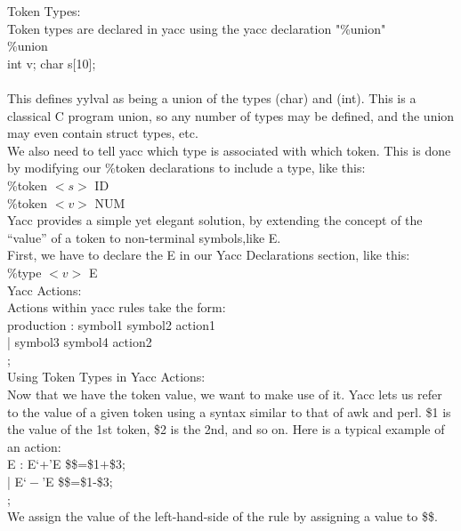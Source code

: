 \documentclass[11pt]{article}
\begin{document}
	\noindent
	Token Types:\\
	Token types are declared in yacc using the yacc declaration "\%union"\\
	
	\noindent
	\%union{\\
		int v; char s[10];\\
	}\\
	
	This defines yylval as being a union of the types (char) and (int). This is a classical C program union, so any number of types may be defined, and the union may even contain struct types, etc.\\
	We also need to tell yacc which type is associated with which token. This is done by modifying our \%token declarations to include a type, like this:\\
	
	\noindent
	\%token $<s>$ ID\\
	\%token $<v>$ NUM\\
	Yacc provides a simple yet elegant solution, by extending the concept of the “value” of a token to non-terminal symbols,like E.\\ First, we have to declare the E in our Yacc Declarations section, like this:\\
	
	\noindent
	\%type $<v>$ E\\
	
	\noindent
	Yacc Actions:\\
	Actions within yacc rules take the form:\\
	production : symbol1 symbol2 { action1 }\\
	| symbol3 symbol4 { action2 }\\
	;\\
	
	\noindent
	Using Token Types in Yacc Actions:\\
	Now that we have the token value, we want to make use of it. Yacc lets us refer to the value of a given token using a syntax similar to that of awk and perl. \$1 is the value of the 1st token, \$2 is the 2nd, and so on. Here is a typical example of an action:\\
	
	E : E‘+’E { \$\$=\$1$+$\$3; }\\
	| E$‘-’$E { \$\$=\$1-\$3; }\\
	;\\
	We assign the value of the left-hand-side of the rule by assigning a value to \$\$.\\
	
\end{document}
